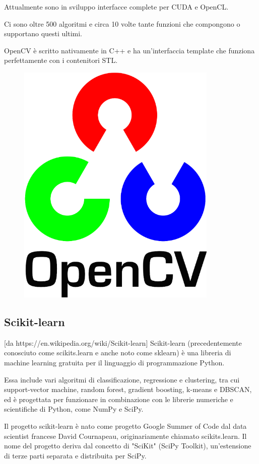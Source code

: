 Attualmente sono in sviluppo interfacce complete per CUDA e OpenCL. 

Ci sono oltre 500 algoritmi e circa 10 volte tante funzioni che compongono o supportano questi ultimi.

OpenCV è scritto nativamente in C++ e ha un'interfaccia template che funziona perfettamente con i contenitori STL.

\begin{figure}
    \begin{center}    
        \includegraphics[width=0.5\linewidth]{images/image8.png}
    \end{center}
\end{figure}

\subsection{Scikit-learn}
[da https://en.wikipedia.org/wiki/Scikit-learn]
Scikit-learn (precedentemente conosciuto come scikits.learn e anche noto come sklearn) è una libreria di machine learning gratuita per il linguaggio di programmazione Python. 

Essa include vari algoritmi di classificazione, regressione e clustering, tra cui support-vector machine, random forest, gradient boosting, k-means e DBSCAN, ed è progettata per funzionare in combinazione con le librerie numeriche e scientifiche di Python, come NumPy e SciPy. 

Il progetto scikit-learn è nato come progetto Google Summer of Code dal data scientist francese David Cournapeau, originariamente chiamato scikits.learn. Il nome del progetto deriva dal concetto di "SciKit" (SciPy Toolkit), un'estensione di terze parti separata e distribuita per SciPy. 

